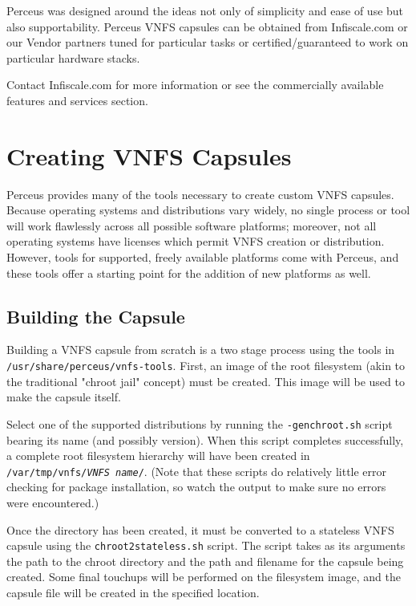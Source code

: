 \documentclass[10pt,letterpaper]{report}
\begin{document}
Perceus was designed around the ideas not only of simplicity and ease of use
but also supportability.  Perceus VNFS capsules can be obtained from
Infiscale.com or our Vendor partners tuned for particular tasks or
certified/guaranteed to work on particular hardware stacks.

Contact Infiscale.com for more information or see the commercially available
features and services section.

\section{Creating VNFS Capsules}

Perceus provides many of the tools necessary to create custom VNFS capsules.
Because operating systems and distributions vary widely, no single process or
tool will work flawlessly across all possible software platforms; moreover,
not all operating systems have licenses which permit VNFS creation or
distribution.  However, tools for supported, freely available platforms come
with Perceus, and these tools offer a starting point for the addition of new
platforms as well.

\subsection{Building the Capsule}

Building a VNFS capsule from scratch is a two stage process using the tools in
{\tt /usr/share/perceus/vnfs-tools}.  First, an image of the root filesystem
(akin to the traditional "chroot jail" concept) must be created.  This image
will be used to make the capsule itself.

Select one of the supported distributions by running the {\tt *-genchroot.sh}
script bearing its name (and possibly version).  When this script completes
successfully, a complete root filesystem hierarchy will have been created in {\tt
/var/tmp/vnfs/{\it VNFS name}/}.  (Note that these scripts do relatively little
error checking for package installation, so watch the output to make sure no
errors were encountered.)

Once the directory has been created, it must be converted to a stateless VNFS
capsule using the {\tt chroot2stateless.sh} script.  The script takes as its
arguments the path to the chroot directory and the path and filename for the
capsule being created.  Some final touchups will be performed on the
filesystem image, and the capsule file will be created in the specified
location.
\end{document}
